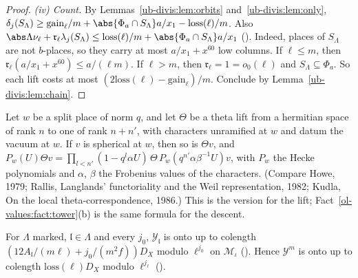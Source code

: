 \begin{proof}
\emph{(iv) Count.} By Lemmas~\ref{ub-divis:lem:orbits} and~\ref{ub-divis:lem:only},
$\delta_j(S_\Lambda)\ge\mathrm{gain}_\ell/m+\abs{\Phi_a\cap S_\Lambda}a/x_1-\mathrm{loss}(\ell)/m$. Also
$\abs\Lambda\nu_\ell+\mathfrak r_\ell\lambda_j(S_\Lambda)\le\mathrm{loss}(\ell)/m+\abs{\Phi_a\cap
S_\Lambda}a/x_1$ (). Indeed,
places of $S_\Lambda$ are not $b$-places, so they carry at most $a/x_1+x^{60}$ low columns. If
$\ell\le m$, then $\mathfrak r_\ell(a/x_1+x^{60})\le a/(\ell m)$. If $\ell>m$, then $\mathfrak r_\ell=1=o_0(\ell)$
and $S_\Lambda\subseteq\Phi_a$. So each lift costs at most $(2\mathrm{loss}(\ell)-\mathrm{gain}_\ell)/m$.
Conclude by Lemma~\ref{ub-divis:lem:chain}.
\end{proof}

\begin{fact}
\label{ub-divis:fact:hecke}
Let $w$ be a split place of norm $q$, and let $\Theta$ be a theta lift from a hermitian space of
rank $n$ to one of rank $n+n'$, with characters unramified at $w$ and datum the vacuum at $w$. If $v$
is spherical at $w$, then so is $\Theta v$, and $P_w(U)\Theta v=\prod_{l<n'}(1-q^l\alpha U)\,\Theta\,
P_w(q^{n'}\alpha\beta^{-1}U)v$, with $P_w$ the Hecke polynomials and $\alpha$, $\beta$ the Frobenius
values of the characters. (Compare Howe, 1979; Rallis, Langlands' functoriality and the Weil
representation, 1982; Kudla, On the local theta-correspondence, 1986.) This is the version for the
lift; Fact~\ref{ol-values:fact:tower}(b) is the same formula for the descent.
\end{fact}

\begin{proposition}[Colength]\label{ub-divis:prop:col}
For $\Lambda$ marked, $\mathfrak l\in\Lambda$ and every $j_0$, $\mathcal Y_{\mathfrak l}$ is onto up to
colength $(12A_{\mathfrak l}/(m\ell)+j_0/(m^2f))D_X$ modulo $\ell^{j_0}$ on $\mathcal M_\iota$
(). Hence $\mathcal Y^m$ is onto up to
colength $\mathrm{loss}(\ell)D_X$ modulo $\ell^{j_\ell}$
().
\end{proposition}

